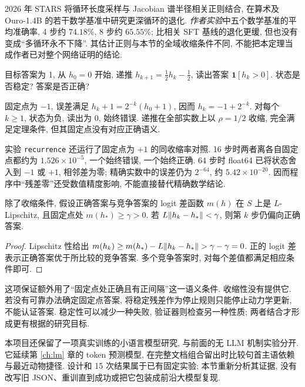 2026 年 STARS 将循环长度采样与 Jacobian 谱半径相关正则结合, 在算术及 Ouro-1.4B 的若干数学基准中研究更深循环的退化\cite{stars}. \emph{作者实验}中五个数学基准的平均准确率, 4 步约 $74.18\%$, 8 步约 $65.55\%$; 比相关 SFT 基线的退化更缓, 但也没有变成“多循环永不下降”. 其估计正则与本节的全域收缩条件不同, 不能把本定理当成作者已对整个网络证明的结论.

\begin{example}
目标答案为 1, 从 $h_0=0$ 开始, 递推 $h_{k+1}=\frac12h_k-\frac12$, 读出答案 $\mathbf1[h_k>0]$. 状态是否稳定? 答案是否正确?
\end{example}
\begin{solution}
固定点为 $-1$, 误差满足 $h_k+1=2^{-k}(h_0+1)$, 因而 $h_k=-1+2^{-k}$. 对每个 $k\ge1$, 状态为负, 读出为 0, 始终错误. 递推在全部实数上以 $\rho=1/2$ 收缩, 完全满足定理条件, 但其固定点没有对应正确语义.
\end{solution}
实验 \texttt{recurrence} 还运行了固定点为 $+1$ 的同收缩率对照. 16 步时两者离各自固定点都约为 $1.526\times10^{-5}$, 一个始终错误, 一个始终正确. 64 步时 float64 已将状态舍入到 $-1$ 或 $+1$, 相邻差为零; 精确实数中的误差仍为 $2^{-64}$, 约 $5.42\times10^{-20}$. 因而程序中“残差零”还受数值精度影响, 不能直接替代精确数学结论.

\begin{proposition}
除了收缩条件, 假设正确答案与竞争答案的 logit 差函数 $m(h)$ 在 $S$ 上是 $L$-Lipschitz, 且固定点处 $m(h_*)\ge\gamma>0$. 若 $L\lVert h_k-h_*\rVert<\gamma$, 则第 $k$ 步仍偏向正确答案.
\end{proposition}
\begin{proof}
Lipschitz 性给出 $m(h_k)\ge m(h_*)-L\lVert h_k-h_*\rVert>\gamma-\gamma=0$. 正的 logit 差表示正确答案优于所比较的竞争答案. 多个竞争答案时, 对每个差值都满足相应条件即可.
\end{proof}
这项保证额外用了“固定点处正确且有正间隔”这一语义条件. 收缩性没有提供它. 若没有可靠办法确定固定点答案, 将稳定残差作为停止规则只能停止动力学更新, 不能认证答案. 稳定性可以减少一种失败, 验证器则检查另一种性质; 两者结合才形成更有根据的研究目标.

\label{sec:micro-study}
本项目还保留了一项真实训练的小语言模型研究, 与前面的无 LLM 机制实验分开. 它延续第 \ref{ch:lm} 章的 token 预测模型, 在完整文档组合留出时比较句首主语依赖与最近动物捷径. 设计和 15 次结果属于已有固定实验; 本节重新分析其证据, 没有改写旧 JSON、重训直到成功或把它包装成前沿大模型复现.

